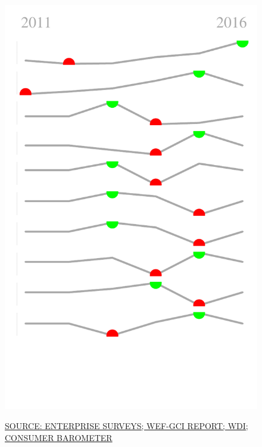 \documentclass{article}\usepackage[]{graphicx}\usepackage[]{color}
\makeatletter
\def\maxwidth{ %
  \ifdim\Gin@nat@width>\linewidth
    \linewidth
  \else
    \Gin@nat@width
  \fi
}
\makeatother
\begin{document}
\begin{figure}
\begin{minipage}[c]{0.95\textwidth}
\begin{minipage}[c]{0.83\textwidth}
{    }
  \end{minipage}
  \begin{minipage}[c]{0.125\textwidth}
    \vspace*{+1.1cm}


{\centering \includegraphics[width=\maxwidth]{figure/sparklines_Culture-1} 

}



    \vspace*{-0.5cm}
  \end{minipage}
  
  \scriptsize{\href{NA}{\textcolor[HTML]{22A6F5}{SOURCE: ENTERPRISE SURVEYS; WEF-GCI REPORT; WDI; CONSUMER BAROMETER}}}
  

\end{minipage}
\end{figure}
\end{document}
